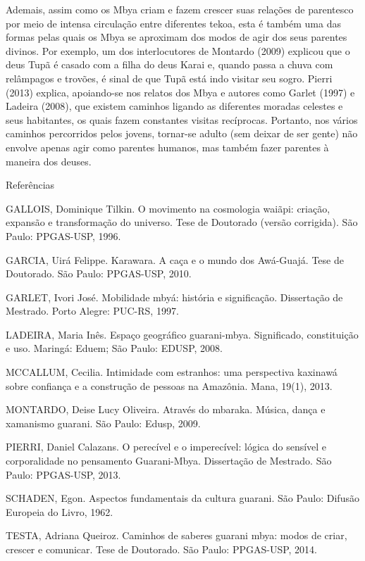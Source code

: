 \documentclass{article}
\begin{document}
Ademais, assim como os Mbya criam e fazem crescer suas rela\c{c}\~oes de
parentesco por meio de intensa circula\c{c}\~ao entre diferentes tekoa,
esta \'e tamb\'em uma das formas pelas quais os Mbya se aproximam dos
modos de agir dos seus parentes divinos. Por exemplo, um dos
interlocutores de Montardo (2009) explicou que o deus Tup\~a \'e casado
com a filha do deus Karai e, quando passa a chuva com rel\^ampagos e
trov\~oes, \'e sinal de que Tup\~a est\'a indo visitar seu sogro.
Pierri (2013) explica, apoiando-se nos relatos dos Mbya e autores como
Garlet (1997) e Ladeira (2008), que existem caminhos ligando as
diferentes moradas celestes e seus habitantes, os quais fazem
constantes visitas rec\'iprocas. Portanto, nos v\'arios caminhos
percorridos pelos jovens, tornar-se adulto (sem deixar de ser gente)
n\~ao envolve apenas agir como parentes humanos, mas tamb\'em fazer
parentes \`a maneira dos deuses.

Refer\^encias

GALLOIS, Dominique Tilkin. O movimento na cosmologia wai\~api:
cria\c{c}\~ao, expans\~ao e transforma\c{c}\~ao do universo. Tese de
Doutorado (vers\~ao corrigida). S\~ao Paulo: PPGAS-USP, 1996.

GARCIA, Uir\'a Felippe. Karawara. A ca\c{c}a e o mundo dos
Aw\'a-Guaj\'a. Tese de Doutorado. S\~ao Paulo: PPGAS-USP, 2010.

GARLET, Ivori Jos\'e. Mobilidade mby\'a: hist\'oria e
significa\c{c}\~ao. Disserta\c{c}\~ao de Mestrado. Porto Alegre:
PUC-RS, 1997.

LADEIRA, Maria In\^es. Espa\c{c}o geogr\'afico guarani-mbya.
Significado, constitui\c{c}\~ao e uso. Maring\'a: Eduem; S\~ao Paulo:
EDUSP, 2008.

MCCALLUM, Cecilia. Intimidade com estranhos: uma perspectiva kaxinaw\'a
sobre confian\c{c}a e a constru\c{c}\~ao de pessoas na Amaz\^onia.
Mana, 19(1), 2013.

MONTARDO, Deise Lucy Oliveira. Atrav\'es do mbaraka. M\'usica, dan\c{c}a
e xamanismo guarani. S\~ao Paulo: Edusp, 2009.

PIERRI, Daniel Calazans. O perec\'ivel e o imperec\'ivel: l\'ogica do
sens\'ivel e corporalidade no pensamento Guarani-Mbya.
Disserta\c{c}\~ao de Mestrado. S\~ao Paulo: PPGAS-USP, 2013.

SCHADEN, Egon. Aspectos fundamentais da cultura guarani. S\~ao Paulo:
Difus\~ao Europeia do Livro, 1962.

TESTA, Adriana Queiroz. Caminhos de saberes guarani mbya: modos de
criar, crescer e comunicar. Tese de Doutorado. S\~ao Paulo: PPGAS-USP,
2014.
\end{document}
